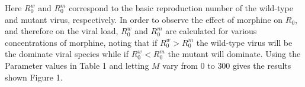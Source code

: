 \documentclass[11pt, oneside]{article}    %
\begin{document}





Here $R_0^w$ and $R_0^m$ correspond to the basic reproduction number of the wild-type and mutant virus, respectively. In order to observe the effect of morphine on $R_0$, and therefore on the viral load, $R_0^w$ and $R_0^m$ are calculated for various concentrations of morphine, noting that if $R_0^w > R_0^m$ the wild-type virus will be the dominate viral species while if $R_0^w < R_0^m$ the mutant will dominate. Using the Parameter values in Table 1 and letting $M$ vary from $0$ to $300$ gives the results shown Figure 1.
\end{document}
